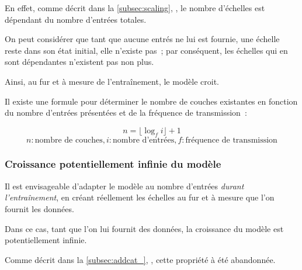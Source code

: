 {En effet, comme décrit dans la \autoref{subsec:scaling}, , le nombre d'échelles est dépendant du nombre d'entrées totales. 

On peut considérer que tant que aucune entrés ne lui est fournie, une échelle reste dans son état initial, elle n'\og existe\fg{} pas~; par conséquent, les échelles qui en sont dépendantes n'\og existent\fg{} pas non plus.

Ainsi, au fur et à mesure de l'entraînement, le modèle croit.

Il existe une formule pour déterminer le nombre de couches \og existantes\fg{} en fonction du nombre d'entrées présentées et de la fréquence de transmission~:

\[n = \lfloor\log_f i\rfloor + 1\]%
\[n: \text{nombre de couches}, i: \text{nombre d'entrées}, f: \text{fréquence de transmission}\]\label{growth_formula}

\subsubsection{Croissance potentiellement infinie du modèle}\label{inf_growth}
Il est envisageable d'adapter le modèle au nombre d'entrées \textit{durant l'entraînement}, en créant réellement les échelles au fur et à mesure que l’on fournit les données.

Dans ce cas, tant que l'on lui fournit des données, la croissance du modèle est potentiellement infinie.

Comme décrit dans la \autoref{subsec:addcat_}, , cette propriété à été abandonnée.

%
%	
}